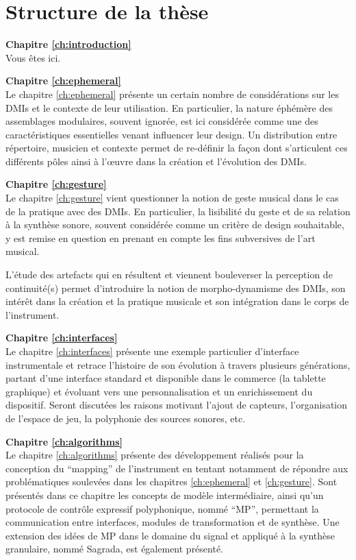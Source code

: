 \section{Structure de la thèse}
\label{sec:preamble:structure}

\textbf{Chapitre \ref{ch:introduction}} \\[0.2em]
Vous êtes ici.

\textbf{Chapitre \ref{ch:ephemeral}} \\[0.2em]
Le chapitre \ref{ch:ephemeral} présente un certain nombre de considérations sur les \glspl{DMI} et le contexte de leur utilisation. En particulier, la nature éphémère des assemblages modulaires, souvent ignorée, est ici considérée comme une des caractéristiques essentielles venant influencer leur design. Un distribution entre répertoire, musicien et contexte permet de re-définir la façon dont s'articulent ces différents pôles ainsi à l'œuvre dans la création et l'évolution des DMIs.

\textbf{Chapitre \ref{ch:gesture}} \\[0.2em]
Le chapitre \ref{ch:gesture} vient questionner la notion de geste musical dans le cas de la pratique avec des DMIs. En particulier, la lisibilité du geste et de sa relation à la synthèse sonore, souvent considérée comme un critère de design souhaitable, y est remise en question en prenant en compte les fins subversives de l'art musical. 

L'étude des artefacts qui en résultent et viennent bouleverser la perception de continuité(s) permet d'introduire la notion de morpho-dynamisme des DMIs, son intérêt dans la création et la pratique musicale et son intégration dans le corps de l'instrument.

\textbf{Chapitre \ref{ch:interfaces}} \\[0.2em]
Le chapitre \ref{ch:interfaces} présente une exemple particulier d'interface instrumentale et retrace l'histoire de son évolution à travers plusieurs générations, partant d'une interface standard et disponible dans le commerce (la tablette graphique) et évoluant vers une personnalisation et un enrichissement du dispositif. 
Seront discutées les raisons motivant l'ajout de capteurs, l'organisation de l'espace de jeu, la polyphonie des sources sonores, etc.

\textbf{Chapitre \ref{ch:algorithms}} \\[0.2em]
Le chapitre \ref{ch:algorithms} présente des développement réalisés pour la conception du ``mapping'' de l'instrument en tentant notamment de répondre aux problématiques soulevées dans les chapitres \ref{ch:ephemeral} et \ref{ch:gesture}. Sont présentés dans ce chapitre les concepts de modèle intermédiaire, ainsi qu'un protocole de contrôle expressif polyphonique, nommé ``MP'', permettant la communication entre interfaces, modules de transformation et de synthèse. Une extension des idées de MP dans le domaine du signal et appliqué à la synthèse granulaire, nommé Sagrada, est également présenté.

